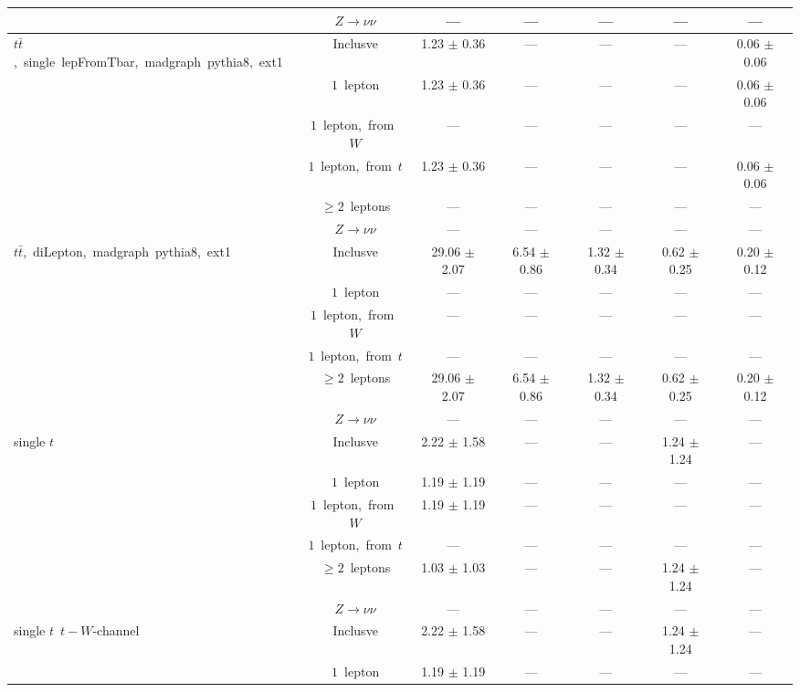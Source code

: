 \documentclass{article}
\begin{document}
\begin{longtable}{|l|c|c|c|c|c|c|}
 & $Z\rightarrow\nu\nu$  & ---  & ---  & ---  & ---  & --- \\* 
\hline 
\multirow{6}{*}{$t\bar{t}$,~single~lepFromTbar,~madgraph~pythia8,~ext1} & Inclusve  & 1.23 $\pm$ 0.36  & ---  & ---  & ---  & 0.06 $\pm$ 0.06 \\* 
 & $1$~lepton  & 1.23 $\pm$ 0.36  & ---  & ---  & ---  & 0.06 $\pm$ 0.06 \\* 
 & $1$~lepton,~from~$W$  & ---  & ---  & ---  & ---  & --- \\* 
 & $1$~lepton,~from~$t$  & 1.23 $\pm$ 0.36  & ---  & ---  & ---  & 0.06 $\pm$ 0.06 \\* 
 & $\ge2$~leptons  & ---  & ---  & ---  & ---  & --- \\* 
 & $Z\rightarrow\nu\nu$  & ---  & ---  & ---  & ---  & --- \\* 
\hline 
\multirow{6}{*}{$t\bar{t}$,~diLepton,~madgraph~pythia8,~ext1} & Inclusve  & 29.06 $\pm$ 2.07  & 6.54 $\pm$ 0.86  & 1.32 $\pm$ 0.34  & 0.62 $\pm$ 0.25  & 0.20 $\pm$ 0.12 \\* 
 & $1$~lepton  & ---  & ---  & ---  & ---  & --- \\* 
 & $1$~lepton,~from~$W$  & ---  & ---  & ---  & ---  & --- \\* 
 & $1$~lepton,~from~$t$  & ---  & ---  & ---  & ---  & --- \\* 
 & $\ge2$~leptons  & 29.06 $\pm$ 2.07  & 6.54 $\pm$ 0.86  & 1.32 $\pm$ 0.34  & 0.62 $\pm$ 0.25  & 0.20 $\pm$ 0.12 \\* 
 & $Z\rightarrow\nu\nu$  & ---  & ---  & ---  & ---  & --- \\* 
\hline 
\multirow{6}{*}{single $t$} & Inclusve  & 2.22 $\pm$ 1.58  & ---  & ---  & 1.24 $\pm$ 1.24  & --- \\* 
 & $1$~lepton  & 1.19 $\pm$ 1.19  & ---  & ---  & ---  & --- \\* 
 & $1$~lepton,~from~$W$  & 1.19 $\pm$ 1.19  & ---  & ---  & ---  & --- \\* 
 & $1$~lepton,~from~$t$  & ---  & ---  & ---  & ---  & --- \\* 
 & $\ge2$~leptons  & 1.03 $\pm$ 1.03  & ---  & ---  & 1.24 $\pm$ 1.24  & --- \\* 
 & $Z\rightarrow\nu\nu$  & ---  & ---  & ---  & ---  & --- \\* 
\hline 
\multirow{6}{*}{single $t$~$t-W$-channel} & Inclusve  & 2.22 $\pm$ 1.58  & ---  & ---  & 1.24 $\pm$ 1.24  & --- \\* 
 & $1$~lepton  & 1.19 $\pm$ 1.19  & ---  & ---  & ---  & --- \\* 

\end{longtable}
\end{document}
